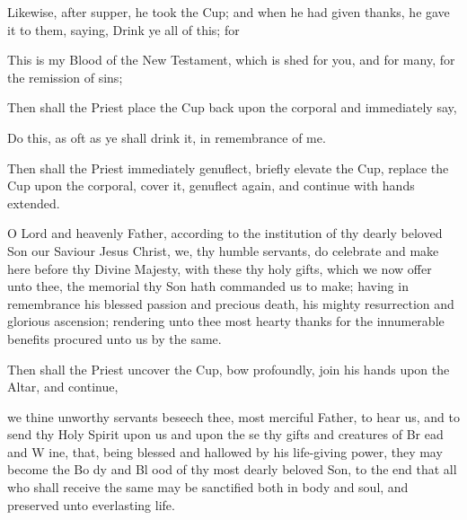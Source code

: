 Likewise, after supper, he took the Cup; and when he had given {} thanks, he gave it to them, saying, Drink ye all of this; for
\begin{center}
\large{This is my Blood of the New Testament, which is shed for you, and for many, for the remission of sins;}
\end{center}
\begin{rubric}
    Then shall the Priest place the Cup back upon the corporal and immediately say,
\end{rubric}\par\noindent
    \centerline{Do this, as oft as ye shall drink it, in remembrance of me.}
\begin{rubric}
    Then shall the Priest immediately genuflect, briefly elevate the Cup, replace the Cup upon the corporal, cover it, genuflect again, and continue with hands extended.
\end{rubric}
 O Lord and heavenly Father, according to the institution of thy dearly beloved Son our Saviour Jesus Christ, we, thy humble servants, do celebrate and make here before thy Divine Majesty, with these thy holy {} gifts, which we now offer unto thee, the memorial thy Son hath commanded us to make; having in remembrance his blessed passion and precious death, his mighty resurrection and glorious ascension; rendering unto thee most hearty thanks for the innumerable benefits procured unto us by the same.
\begin{rubric}
	Then shall the Priest uncover the Cup, bow profoundly, join his hands upon the Altar, and continue,
\end{rubric}
 we thine unworthy servants beseech thee, most merciful Father, to hear us, and to send thy Holy Spirit upon us and upon the {} se thy gifts and creatures of Br {} ead and W {} ine, that, being blessed and hallowed by his life-giving power, they may become the Bo {} dy and Bl {} ood of thy most dearly beloved Son, to the end that all who shall receive the same may be sanctified both in body and soul, and preserved unto everlasting life.
